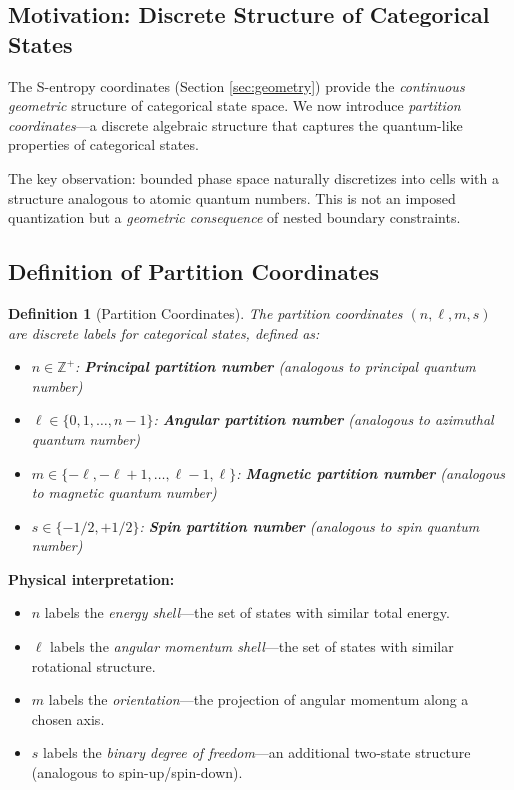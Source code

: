 \documentclass[twocolumn,10pt]{article}
\newtheorem{definition}[theorem]{Definition}
\theoremstyle{remark}
\begin{document}
\subsection{Motivation: Discrete Structure of Categorical States}

The S-entropy coordinates (Section \ref{sec:geometry}) provide the \textit{continuous geometric} structure of categorical state space. We now introduce \textit{partition coordinates}—a discrete algebraic structure that captures the quantum-like properties of categorical states.

The key observation: bounded phase space naturally discretizes into cells with a structure analogous to atomic quantum numbers. This is not an imposed quantization but a \textit{geometric consequence} of nested boundary constraints.

\subsection{Definition of Partition Coordinates}

\begin{definition}[Partition Coordinates]
\label{def:partition_coordinates}
The partition coordinates $(n, \ell, m, s)$ are discrete labels for categorical states, defined as:
\begin{itemize}
    \item $n \in \mathbb{Z}^+$: \textbf{Principal partition number} (analogous to principal quantum number)
    \item $\ell \in \{0, 1, \ldots, n-1\}$: \textbf{Angular partition number} (analogous to azimuthal quantum number)
    \item $m \in \{-\ell, -\ell+1, \ldots, \ell-1, \ell\}$: \textbf{Magnetic partition number} (analogous to magnetic quantum number)
    \item $s \in \{-1/2, +1/2\}$: \textbf{Spin partition number} (analogous to spin quantum number)
\end{itemize}
\end{definition}

\textbf{Physical interpretation:}
\begin{itemize}
    \item $n$ labels the \textit{energy shell}—the set of states with similar total energy.
    \item $\ell$ labels the \textit{angular momentum shell}—the set of states with similar rotational structure.
    \item $m$ labels the \textit{orientation}—the projection of angular momentum along a chosen axis.
    \item $s$ labels the \textit{binary degree of freedom}—an additional two-state structure (analogous to spin-up/spin-down).
\end{itemize}
\end{document}
